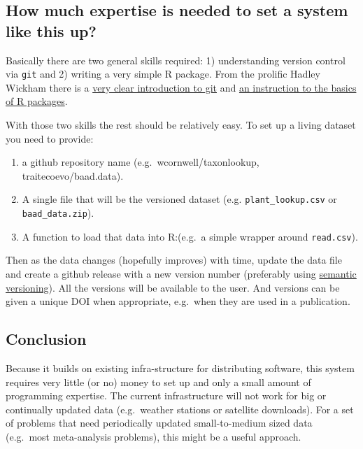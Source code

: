 \documentclass[a4paper,11pt]{article}
\begin{document}
\subsection{How much expertise is needed to set a system like this
up?}

Basically there are two general skills required: 1) understanding
version control via \texttt{git} and 2) writing a very simple R package.
From the prolific Hadley Wickham there is a
\href{http://r-pkgs.had.co.nz/git.html}{very clear introduction to git}
and \href{http://r-pkgs.had.co.nz/intro.html}{an instruction to the
basics of R packages}.

With those two skills the rest should be relatively easy. To set up a
living dataset you need to provide:
\begin{enumerate}
  \item a github repository name (e.g.~wcornwell/taxonlookup, traitecoevo/baad.data).
  \item A single file that will be the versioned dataset (e.g. \texttt{plant\_lookup.csv} or \texttt{baad\_data.zip}).
  \item A function to load that data into R:(e.g.~a simple wrapper around \texttt{read.csv}).
\end{enumerate}

Then as the data changes (hopefully improves) with time, update the data
file and create a github release with a new version number (preferably
using \href{http://semver.org/}{semantic versioning}). All the versions
will be available to the user. And versions can be given a unique DOI
when appropriate, e.g.~when they are used in a publication.

\subsection{Conclusion}

Because it builds on existing infra-structure for distributing software,
this system requires very little (or no) money to set up and only a
small amount of programming expertise. The current infrastructure will
not work for big or continually updated data (e.g.~weather stations or
satellite downloads). For a set of problems that need periodically
updated small-to-medium sized data (e.g.~most meta-analysis problems),
this might be a useful approach.


\end{document}
